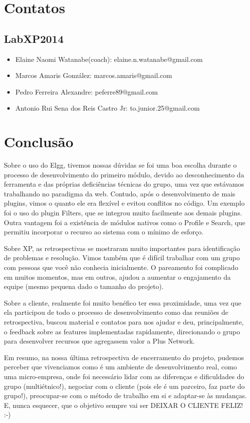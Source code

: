 \documentclass[12pt, letterpaper, onecolumn]{article}
\begin{document}
\section{Contatos}

\subsection*{LabXP2014}
\begin{itemize}
\item Elaine Naomi Watanabe(coach): elaine.n.watanabe@gmail.com
\item Marcos Amaris González: marcos.amaris@gmail.com
\item Pedro Ferreira Alexandre: peferre89@gmail.com
\item Antonio Rui Sena dos Reis Castro Jr: to.junior.25@gmail.com
\end{itemize}

\section{Conclusão}
Sobre o uso do Elgg, tivemos nossas dúvidas se foi uma boa escolha durante o processo de desenvolvimento do primeiro módulo, devido ao desconhecimento da ferramenta e das próprias deficiências técnicas do grupo, uma vez que estávamos trabalhando no paradigma da web. Contudo, após o desenvolvimento de mais plugins, vimos o quanto ele era flexível e evitou conflitos no código. Um exemplo foi o uso do plugin Filters, que se integrou muito facilmente aos demais plugins. Outra vantagem foi a existência de módulos nativos como o Profile e Search, que permitiu incorporar o recurso ao sistema com o mínimo de esforço.

Sobre XP, as retrospectivas se mostraram muito importantes para identificação de problemas e resolução. Vimos também que é difícil trabalhar com um grupo com pessoas que você não conhecia inicialmente. O pareamento foi complicado em muitos momentos, mas em outros, ajudou a aumentar o engajamento da equipe (mesmo pequena dado o tamanho do projeto).

Sobre a cliente, realmente foi muito benéfico ter essa proximidade, uma vez que ela participou de todo o processo de desenvolvimento como das reuniões de retrospectiva, buscou material e contatos para nos ajudar e deu, principalmente, o feedback sobre as features implementadas rapidamente, direcionando o grupo para desenvolver recursos que agregassem valor a Plus Network.

Em resumo, na nossa última retrospectiva de encerramento do projeto, pudemos perceber que vivenciamos como é um ambiente de desenvolvimento real, como uma micro-empresa, onde foi necessário lidar com as diferenças e dificuldades do grupo (multiétnico!), negociar com o cliente (pois ele é um parceiro, faz parte do grupo!), preocupar-se com o método de trabalho em si e adaptar-se às mudanças. E, nunca esquecer, que o objetivo sempre vai ser DEIXAR O CLIENTE FELIZ! :-)
\end{document}
